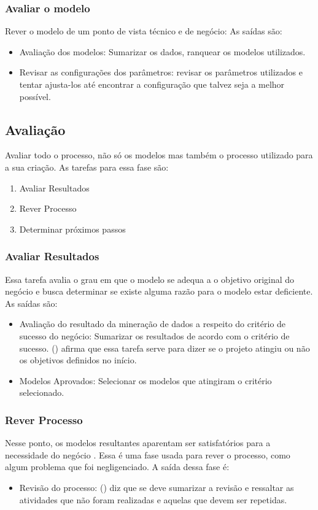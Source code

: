 \subsubsection{Avaliar o modelo}
Rever o modelo de um ponto de vista técnico e de negócio:
As saídas são:
\begin{itemize}
    \item Avaliação dos modelos: Sumarizar os dados, ranquear os modelos utilizados.
    \item Revisar as configurações dos parâmetros: revisar os parâmetros utilizados e tentar ajusta-los até encontrar a configuração que talvez seja a melhor possível.
\end{itemize}
\subsection{Avaliação}
Avaliar todo o processo, não só os modelos mas também o processo utilizado para a sua criação.
As tarefas para essa fase são:
\begin{enumerate}
    \item Avaliar Resultados
    \item Rever Processo
    \item Determinar próximos passos
\end{enumerate}
\subsubsection{Avaliar Resultados}
Essa tarefa avalia o grau em que o modelo se adequa a o objetivo original do negócio e busca determinar se existe alguma razão para o modelo estar deficiente.
As saídas são: 
\begin{itemize}
    \item Avaliação do resultado da mineração de dados a respeito do critério de sucesso do negócio: Sumarizar os resultados de acordo com o critério de sucesso. \citeauthor{dmfd} (\citeyear[86]{dmfd}) afirma que essa tarefa serve para dizer se o projeto atingiu ou não os objetivos definidos no início.
    \item Modelos Aprovados: Selecionar os modelos que atingiram o critério selecionado.
\end{itemize}
\subsubsection{Rever Processo}
Nesse ponto, os modelos resultantes aparentam ser satisfatórios para a necessidade do negócio \citep[27]{crispmanual}. Essa é uma fase usada para rever o processo, como algum problema que foi negligenciado. 
A saída dessa fase é:
\begin{itemize}
    \item Revisão do processo: \citeauthor{crispmanual} (\citeyear[27]{crispmanual}) diz que se deve sumarizar a revisão e ressaltar as atividades que não foram realizadas e aquelas que devem ser repetidas.
\end{itemize}
